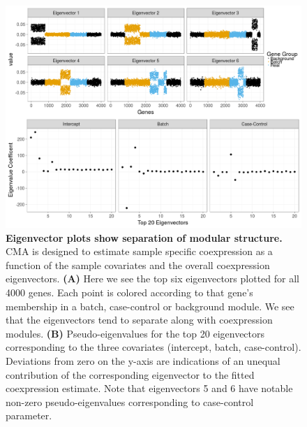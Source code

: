 \begin{figure}
\begin{center}
\includegraphics[width=1\columnwidth]{figures/EigenvectorPlots.png}
\end{center}\caption[Eigenvector plots showing separation of modular structure]{\textbf{Eigenvector plots show separation of modular structure.} CMA is designed to estimate sample specific
coexpression as a function of the sample covariates and the overall
coexpression eigenvectors. \textbf{(A)} Here we see the top six eigenvectors
plotted for all 4000 genes. Each point is colored according to that
gene's membership in a batch, case-control or background module. We
see that the eigenvectors tend to separate along with coexpression
modules. \textbf{(B)} Pseudo-eigenvalues for the top 20 eigenvectors
corresponding to the three covariates (intercept, batch, case-control).
Deviations from zero on the y-axis are indications of an unequal contribution
of the corresponding eigenvector to the fitted coexpression estimate.
Note that eigenvectors 5 and 6 have notable non-zero pseudo-eigenvalues
corresponding to case-control parameter.}
\label{fig:Eigenvector_plots}
\end{figure}


